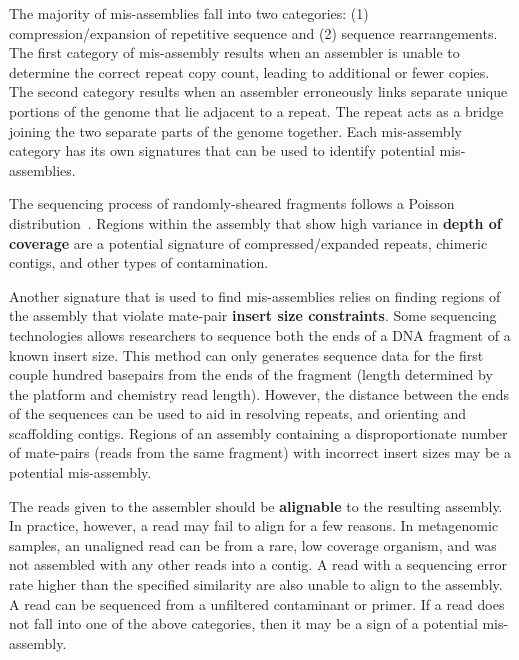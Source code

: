 \documentclass{bioinfo}
\begin{document}
The majority of mis-assemblies fall into two categories: (1) compression/expansion of repetitive sequence and (2) sequence rearrangements.
The first category of mis-assembly results when an assembler is unable to determine the correct repeat copy count, leading to additional or fewer copies.
The second category results when an assembler erroneously links separate unique portions of the genome that lie adjacent to a repeat.
The repeat acts as a bridge joining the two separate parts of the genome together.
Each mis-assembly category has its own signatures that can be used to identify potential mis-assemblies.

The sequencing process of randomly-sheared fragments follows a Poisson distribution~\citep{lander1988genomic}.
Regions within the assembly that show high variance in \textbf{depth of coverage} are a potential signature of compressed/expanded repeats, chimeric contigs, and other types of contamination.

Another signature that is used to find mis-assemblies relies on finding regions of the assembly that violate mate-pair \textbf{insert size constraints}.
Some sequencing technologies allows researchers to sequence both the ends of a DNA fragment of a known insert size.
This method can only generates sequence data for the first couple hundred basepairs from the ends of the fragment (length determined by the platform and chemistry read length). 
However, the distance between the ends of the sequences can be used to aid in resolving repeats, and orienting and scaffolding contigs.
Regions of an assembly containing a disproportionate number of mate-pairs (reads from the same fragment) with incorrect insert sizes may be a potential mis-assembly.

The reads given to the assembler should be \textbf{alignable} to the resulting assembly.
In practice, however, a read may fail to align for a few reasons.
In metagenomic samples, an unaligned read can be from a rare, low coverage organism, and was not assembled with any other reads into a contig.
A read with a sequencing error rate higher than the specified similarity are also unable to align to the assembly.
A read can be sequenced from a unfiltered contaminant or primer.
If a read does not fall into one of the above categories, then it may be a sign of a potential mis-assembly.
\end{document}
